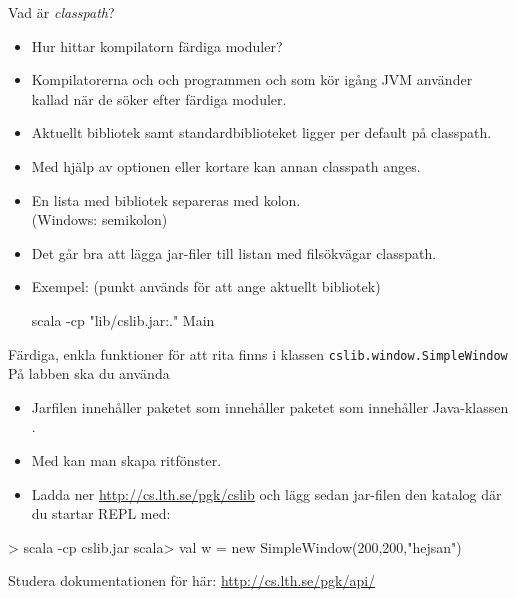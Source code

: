 \begin{Slide}{Vad är \emph{classpath}?}\SlideFontSmall
\begin{itemize}
  \item Hur hittar kompilatorn färdiga moduler?
\pause
\item Kompilatorerna  och  och programmen  och  som kör igång JVM använder  kallad  när de söker efter färdiga moduler.
\pause
\item Aktuellt bibliotek samt standardbiblioteket ligger per default på classpath.
\item Med hjälp av optionen  eller kortare  kan annan classpath anges.
\item En lista med bibliotek separeras med kolon.\\(Windows: semikolon)
\item Det går bra att lägga jar-filer till listan med filsökvägar classpath.
\item Exempel: (punkt används för att ange aktuellt bibliotek)
\begin{REPLnonum}
scala -cp "lib/cslib.jar:." Main
\end{REPLnonum}
\end{itemize}
\end{Slide}


\begin{Slide}{Färdiga, enkla funktioner för att rita finns i klassen \texttt{cslib.window.SimpleWindow}}
På labben ska du använda 
\begin{itemize}
\item Jarfilen  innehåller paketet  som innehåller paketet  som innehåller Java-klassen .
\item Med  kan man skapa ritfönster.
\item Ladda ner \url{http://cs.lth.se/pgk/cslib} och lägg sedan jar-filen den katalog där du startar REPL med: 
\end{itemize}
\pause
\begin{REPLnonum}
> scala -cp cslib.jar
scala> val w = new SimpleWindow(200,200,"hejsan")
\end{REPLnonum}
\pause Studera dokumentationen för  här: \url{http://cs.lth.se/pgk/api/}
\end{Slide}




